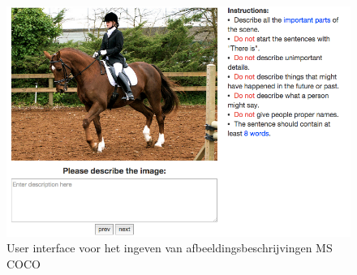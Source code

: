 \begin{figure}[tb]
    \centering
    \includegraphics[width=0.8\linewidth]{Images/coco_UI.png}
    \caption{User interface voor het ingeven van afbeeldingsbeschrijvingen MS COCO}
    \label{fig:coco_ui}
\end{figure}

